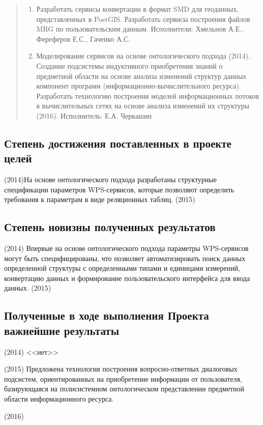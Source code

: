 \documentclass[12pt,a4paper]{ltxdoc}
\begin{document}
\begin{quote}
\begin{enumerate}
\item Разработать сервисы конвертации в формат SMD для геоданных, представленных в PostGIS. Разработать сервисы построения файлов MRG по пользовательским данным. Исполнители: Хмельнов А.Е., Фереферов Е.С., Гаченко А.С.

\item Моделирование сервисов на основе онтологического подхода (2014). Создание подсистемы индуктивного приобретения знаний о предметной области на основе анализа изменений структур данных компонент программ (информационно-вычислительного ресурса). Разработать технологию построения моделей информационных потоков в вычислительных сетях на основе анализа изменений их структуры (2016). Исполнитель: Е.А. Черкашин
\end{enumerate}
\end{quote}

\subsection{Степень достижения поставленных в проекте целей}
 (2014)На основе онтологического подхода разработаны структурные спецификации
 параметров WPS-сервисов, которые позволяют определить требования к параметрам в
 виде реляционных таблиц.
 (2015)

 \subsection{Степень новизны полученных результатов}
 (2014) Впервые на основе онтологического подхода параметры WPS-сервисов могут быть специфицированы, что позволяет автоматизировать поиск данных определенной структуры с определенными типами и единицами измерений, конвертацию данных и формирование пользовательского интерфейса для ввода данных. (2015)



\subsection{Полученные в ходе выполнения Проекта важнейшие результаты}
(2014) <<нет>>

(2015) Предложена технология построения вопросно-ответных диалоговых подсистем,
ориентированных на приобретение информации от пользователя, базирующаяся на
полисистемном онтологическом представлении предметной области информационного
ресурса.

(2016)
\end{document}
